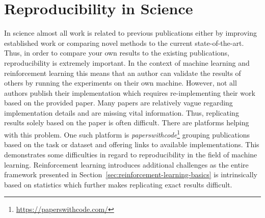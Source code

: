 \section{Reproducibility in Science}\label{sec:disc_repro}
In science almost all work is related to previous publications either by improving established work
or comparing novel methods to the current state-of-the-art.
Thus, in order to compare your own results to the existing publications, reproducibility is extremely important.
In the context of machine learning and reinforcement learning this means that an author can validate the results of
others by running the experiments on their own machine.
However, not all authors publish their implementation which requires re-implementing their work based on the provided paper.
Many papers are relatively vague regarding implementation details and are missing vital information.
Thus, replicating results solely based on the paper is often difficult.
There are platforms helping with this problem.
One such platform is \textit{paperswithcode}\footnote{\url{https://paperswithcode.com/}}
grouping publications based on the task or dataset and offering links to available implementations.
This demonstrates some difficulties in regard to reproducibility in the field of machine learning.
Reinforcement learning introduces additional challenges as the entire framework presented in Section~\ref{sec:reinforcement-learning-basics}
is intrinsically based on statistics which further makes replicating exact results difficult.\\

